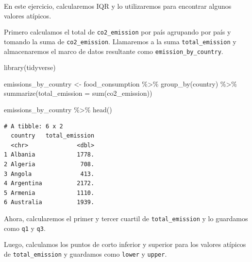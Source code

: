 \documentclass[
  letterpaper,
  DIV=11,
  numbers=noendperiod]{scrreprt}
\newenvironment{Shaded}{\begin{snugshade}}{\end{snugshade}}
\newcommand{\AttributeTok}[1]{\textcolor[rgb]{0.40,0.45,0.13}{#1}}
\newcommand{\FloatTok}[1]{\textcolor[rgb]{0.68,0.00,0.00}{#1}}
\newcommand{\FunctionTok}[1]{\textcolor[rgb]{0.28,0.35,0.67}{#1}}
\newcommand{\NormalTok}[1]{\textcolor[rgb]{0.00,0.23,0.31}{#1}}
\newcommand{\OtherTok}[1]{\textcolor[rgb]{0.00,0.23,0.31}{#1}}
\newcommand{\SpecialCharTok}[1]{\textcolor[rgb]{0.37,0.37,0.37}{#1}}
\begin{document}
En este ejercicio, calcularemos IQR y lo utilizaremos para encontrar
algunos valores atípicos.

Primero calculamos el total de \texttt{co2\_emission} por país agrupando
por país y tomando la suma de \texttt{co2\_emission}. Llamaremos a la
suma \texttt{total\_emission} y almacenaremos el marco de datos
resultante como \texttt{emission\_by\_country}.

\begin{Shaded}
\begin{Highlighting}[]
\FunctionTok{library}\NormalTok{(tidyverse)}

\NormalTok{emissions\_by\_country }\OtherTok{\textless{}{-}}\NormalTok{ food\_consumption }\SpecialCharTok{\%\textgreater{}\%}
  \FunctionTok{group\_by}\NormalTok{(country) }\SpecialCharTok{\%\textgreater{}\%}
  \FunctionTok{summarize}\NormalTok{(}\AttributeTok{total\_emission =} \FunctionTok{sum}\NormalTok{(co2\_emission))}

\NormalTok{emissions\_by\_country }\SpecialCharTok{\%\textgreater{}\%}
  \FunctionTok{head}\NormalTok{()}
\end{Highlighting}
\end{Shaded}

\begin{verbatim}
# A tibble: 6 x 2
  country   total_emission
  <chr>              <dbl>
1 Albania            1778.
2 Algeria             708.
3 Angola              413.
4 Argentina          2172.
5 Armenia            1110.
6 Australia          1939.
\end{verbatim}

Ahora, calcularemos el primer y tercer cuartil de
\texttt{total\_emission} y lo guardamos como \texttt{q1} y \texttt{q3}.

\begin{Shaded}
\end{Shaded}

Luego, calculamos los puntos de corto inferior y superior para los
valores atípicos de \texttt{total\_emission} y guardamos como
\texttt{lower} y \texttt{upper}.
\end{document}
